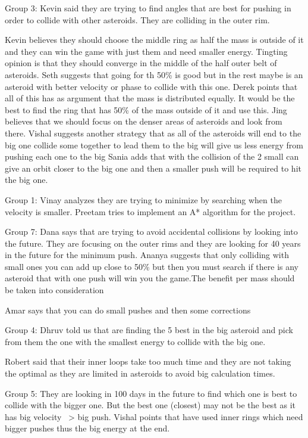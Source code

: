 Group 3:
Kevin said they are trying to find angles that are best for pushing in order to collide with other asteroids. They are colliding in the outer rim.

Kevin believes they should choose the middle ring as half the mass is outside of it and they can win the game with just them and need smaller energy.
Tingting opinion is that they should converge in the middle of the half outer belt of asteroids.
Seth suggests that going for th 50\% is good but in the rest maybe is an asteroid with better velocity or phase to collide with this one.
Derek points that all of this has as argument that the mass is distributed equally. 
It would be the best to find the ring that has 50\% of the mass outside of it and use this.
Jing believes that we should focus on the denser areas of asteroids and look from there.
Vishal suggests another strategy that as all of the asteroids will end to the big one collide some together to lead them to the big will give us less energy from pushing each one to the big
Sania adds that with the collision of the 2 small can give an orbit closer to the big one and then a smaller push will be required to hit the big one.

Group 1:
Vinay analyzes they are trying to minimize by searching when the velocity is smaller.
Preetam tries to implement an A* algorithm for the project.

Group 7:
Dana says that are trying to avoid accidental collisions by looking into the future.
They are focusing on the outer rims and they are looking for 40 years in the future for the minimum push.
Ananya suggests that only colliding with small ones you can add up close to 50\% 
but then you must search if there is any asteroid that with one push will win 
you the game.The benefit per mass should be taken into consideration

Amar says that you can do small pushes and then some corrections


Group 4:
Dhruv told us that are finding the 5 best in the big asteroid and pick from them the one with the smallest energy to collide with the big one.

Robert said that their inner loops take too much time and they are not taking the optimal as they are limited in asteroids to avoid big calculation times.

Group 5:
They are looking in 100 days in the future to find which one is best to collide 
with the bigger one. But the best one (closest) may not be the best as it has big 
velocity ~> big push. 
Vishal points that have used inner rings which need bigger pushes thus the big energy at the end.

